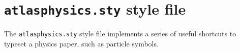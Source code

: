\documentclass[UKenglish,texlive=2013]{\ATLASLATEXPATH atlasdoc}
\author{Ian C. Brock}
\affil{University of Bonn}
\newcommand{\File}[1]{\texttt{#1}\xspace}
\begin{document}
\maketitle

\tableofcontents

\section{\File{atlasphysics.sty} style file}
\label{sec:atlasphysics}

The \File{atlasphysics.sty} style file implements a series of useful
shortcuts to typeset a physics paper, such as particle
symbols.
\end{document}

